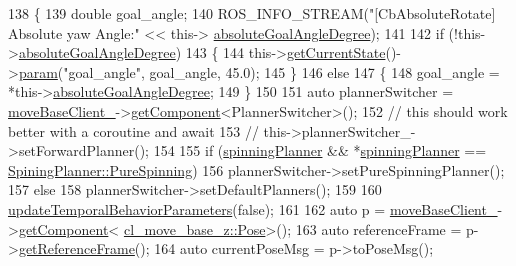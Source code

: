 \begin{DoxyCode}
138 \{
139   \textcolor{keywordtype}{double} goal\_angle;
140   ROS\_INFO\_STREAM(\textcolor{stringliteral}{"[CbAbsoluteRotate] Absolute yaw Angle:"} << this->
      \hyperlink{classcl__move__base__z_1_1CbAbsoluteRotate_ad5d0e21549940444e1cb525cda73329a}{absoluteGoalAngleDegree});
141 
142   \textcolor{keywordflow}{if} (!this->\hyperlink{classcl__move__base__z_1_1CbAbsoluteRotate_ad5d0e21549940444e1cb525cda73329a}{absoluteGoalAngleDegree})
143   \{
144     this->\hyperlink{classsmacc_1_1ISmaccClientBehavior_a34fde34e48fa13db622ee60d8374d0b8}{getCurrentState}()->\hyperlink{classsmacc_1_1ISmaccState_a4f2ff8e3eda8aa9bbb60c8ff17d0def1}{param}(\textcolor{stringliteral}{"goal\_angle"}, goal\_angle, 45.0);
145   \}
146   \textcolor{keywordflow}{else}
147   \{
148     goal\_angle = *this->\hyperlink{classcl__move__base__z_1_1CbAbsoluteRotate_ad5d0e21549940444e1cb525cda73329a}{absoluteGoalAngleDegree};
149   \}
150 
151   \textcolor{keyword}{auto} plannerSwitcher = \hyperlink{classcl__move__base__z_1_1CbMoveBaseClientBehaviorBase_ab2ef219464cfac8659b4a87c8d0db6d5}{moveBaseClient\_}->\hyperlink{classsmacc_1_1ISmaccClient_adef78db601749ca63c19e74a27cb88cc}{getComponent}<PlannerSwitcher>();
152   \textcolor{comment}{// this should work better with a coroutine and await}
153   \textcolor{comment}{// this->plannerSwitcher\_->setForwardPlanner();}
154 
155   \textcolor{keywordflow}{if} (\hyperlink{classcl__move__base__z_1_1CbAbsoluteRotate_a17d836524599af072cf2e3488e491a91}{spinningPlanner} && *\hyperlink{classcl__move__base__z_1_1CbAbsoluteRotate_a17d836524599af072cf2e3488e491a91}{spinningPlanner} == 
      \hyperlink{namespacecl__move__base__z_aab2ad3041275145f0065fb60b3299345aada5274435681a4ce04175bebfa6652f}{SpiningPlanner::PureSpinning})
156     plannerSwitcher->setPureSpinningPlanner();
157   \textcolor{keywordflow}{else}
158     plannerSwitcher->setDefaultPlanners();
159 
160   \hyperlink{classcl__move__base__z_1_1CbAbsoluteRotate_a2d8a4200dcacc00ad60c22ad2af5d4b2}{updateTemporalBehaviorParameters}(\textcolor{keyword}{false});
161 
162   \textcolor{keyword}{auto} p = \hyperlink{classcl__move__base__z_1_1CbMoveBaseClientBehaviorBase_ab2ef219464cfac8659b4a87c8d0db6d5}{moveBaseClient\_}->\hyperlink{classsmacc_1_1ISmaccClient_adef78db601749ca63c19e74a27cb88cc}{getComponent}<
      \hyperlink{classcl__move__base__z_1_1Pose}{cl\_move\_base\_z::Pose}>();
163   \textcolor{keyword}{auto} referenceFrame = p->\hyperlink{classcl__move__base__z_1_1Pose_af8c2dc151e74aa8da6b283d1c8563051}{getReferenceFrame}();
164   \textcolor{keyword}{auto} currentPoseMsg = p->toPoseMsg();

\end{DoxyCode}

